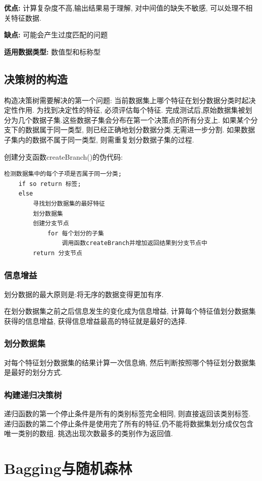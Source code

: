 \documentclass[12pt]{article}
\numberwithin{equation}{section}%
\begin{document}
\textbf{优点: }计算复杂度不高,输出结果易于理解, 对中间值的缺失不敏感, 可以处理不相关特征数据.

\textbf{缺点: }可能会产生过度匹配的问题

\textbf{适用数据类型: }数值型和标称型

\subsection{决策树的构造}

构造决策树需要解决的第一个问题: 当前数据集上哪个特征在划分数据分类时起决定性作用. 为找到决定性的特征, 必须评估每个特征. 完成测试后,原始数据集被划分为几个数据子集.这些数据子集会分布在第一个决策点的所有分支上. 如果某个分支下的数据属于同一类型, 则已经正确地划分数据分类.无需进一步分割. 如果数据子集内的数据不属于同一类型, 则需重复划分数据子集的过程. 

创建分支函数createBranch()的伪代码:

\begin{lstlisting}
检测数据集中的每个子项是否属于同一分类;
	if so return 标签;
	else
		寻找划分数据集的最好特征
		划分数据集
		创建分支节点
			for 每个划分的子集
				调用函数createBranch并增加返回结果到分支节点中
		return 分支节点
\end{lstlisting}

\subsubsection{信息增益}

划分数据的最大原则是:将无序的数据变得更加有序.

在划分数据集之前之后信息发生的变化成为信息增益, 计算每个特征值划分数据集获得的信息增益, 获得信息增益最高的特征就是最好的选择.

\subsubsection{划分数据集}

对每个特征划分数据集的结果计算一次信息熵, 然后判断按照哪个特征划分数据集是最好的划分方式.

\subsubsection{构建递归决策树}

递归函数的第一个停止条件是所有的类别标签完全相同, 则直接返回该类别标签. 递归函数的第二个停止条件是使用完了所有的特征,仍不能将数据集划分成仅包含唯一类别的数组. 挑选出现次数最多的类别作为返回值. 


\section{Bagging与随机森林}




\end{document}
